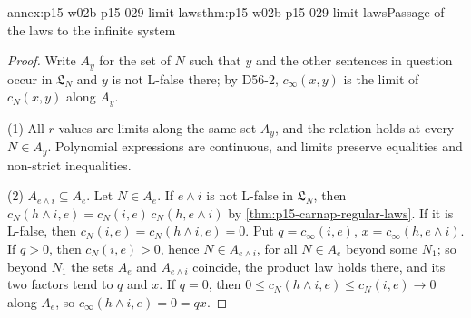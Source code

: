 \begin{annexitem}{annex:p15-w02b-p15-029-limit-laws}{thm:p15-w02b-p15-029-limit-laws}{Passage of the laws to the infinite system}
\begin{proof}
Write \(A_y\) for the set of \(N\) such that \(y\) and the other
sentences in question occur in \(\mathfrak L_N\) and \(y\) is not
L-false there; by D56-2, \(c_\infty(x,y)\) is the limit of
\(c_N(x,y)\) along \(A_y\).

(1) All \(r\) values are limits along the same set \(A_y\), and the
relation holds at every \(N\in A_y\). Polynomial expressions are
continuous, and limits preserve equalities and non-strict inequalities.

(2) \(A_{e\land i}\subseteq A_e\). Let \(N\in A_e\). If \(e\land i\)
is not L-false in \(\mathfrak L_N\), then
\(c_N(h\land i,e)=c_N(i,e)\,c_N(h,e\land i)\) by
\cref{thm:p15-carnap-regular-laws}. If it is L-false, then
\(c_N(i,e)=c_N(h\land i,e)=0\). Put \(q=c_\infty(i,e)\),
\(x=c_\infty(h,e\land i)\). If \(q>0\), then \(c_N(i,e)>0\), hence
\(N\in A_{e\land i}\), for all \(N\in A_e\) beyond some \(N_1\); so
beyond \(N_1\) the sets \(A_e\) and \(A_{e\land i}\) coincide, the
product law holds there, and its two factors tend to \(q\) and \(x\).
If \(q=0\), then \(0\leq c_N(h\land i,e)\leq c_N(i,e)\to0\) along
\(A_e\), so \(c_\infty(h\land i,e)=0=qx\).
\end{proof}
\end{annexitem}

